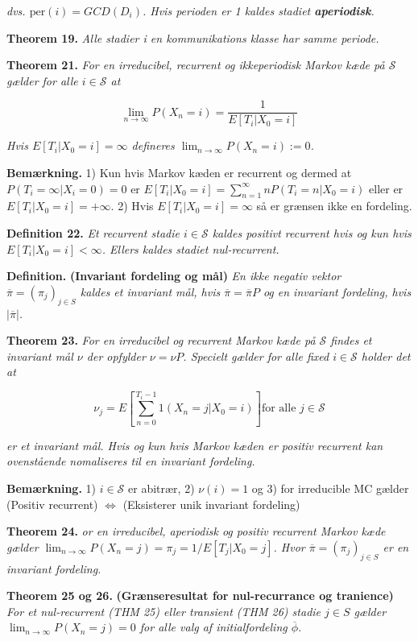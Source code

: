 \documentclass[
]{book}
\begin{document}
\emph{dvs. \(\text{per}(i)=GCD(D_i)\). Hvis perioden er 1 kaldes stadiet \textbf{aperiodisk}.}

\textbf{Theorem 19.} \emph{Alle stadier i en kommunikations klasse har samme periode.}

\textbf{Theorem 21.} \emph{For en irreducibel, recurrent og ikkeperiodisk Markov kæde på \(\mathcal{S}\) gælder for alle \(i\in\mathcal{S}\) at}

\[
\lim_{n\to\infty}P(X_n=i)=\frac{1}{E[T_i \vert X_0=i]}
\]

\emph{Hvis \(E[T_i \vert X_0=i]=\infty\) defineres \(\lim_{n\to\infty}P(X_n=i):=0\).}

\textbf{Bemærkning.} 1) Kun hvis Markov kæden er recurrent og dermed at \(P(T_i=\infty \vert X_i=0)=0\) er \(E[T_i \vert X_0=i]=\sum_{n=1}^\infty nP(T_i=n\vert X_0=i)\) eller er \(E[T_i \vert X_0=i]=+\infty\). 2) Hvis \(E[T_i \vert X_0=i]=\infty\) så er grænsen ikke en fordeling.

\textbf{Definition 22.} \emph{Et recurrent stadie \(i\in\mathcal{S}\) kaldes positivt recurrent hvis og kun hvis \(E[T_i \vert X_0=i]<\infty\). Ellers kaldes stadiet nul-recurrent.}

\textbf{Definition.} \textbf{(Invariant fordeling og mål)} \emph{En ikke negativ vektor \(\overline{\pi}=(\pi_j)_{j\in S}\) kaldes et invariant mål, hvis \(\overline{\pi}=\overline{\pi}P\) og en invariant fordeling, hvis \(\vert\overline{\pi}\vert\).}

\textbf{Theorem 23.} \emph{For en irreducibel og recurrent Markov kæde på \(\mathcal{S}\) findes et invariant mål \(\nu\) der opfylder \(\nu =\nu P\). Specielt gælder for alle fixed \(i\in\mathcal{S}\) holder det at}

\[
\nu_j=E\left[\sum_{n=0}^{T_i-1}1(X_n=j \vert X_0=i)\right] \text{for alle } j\in\mathcal{S}
\]

\emph{er et invariant mål. Hvis og kun hvis Markov kæden er positiv recurrent kan ovenstående nomaliseres til en invariant fordeling.}

\textbf{Bemærkning.} 1) \(i\in\mathcal{S}\) er abitrær, 2) \(\nu(i)=1\) og 3) for irreducible MC gælder (Positiv recurrent) \(\Leftrightarrow\) (Eksisterer unik invariant fordeling)

\textbf{Theorem 24.} \emph{or en irreducibel, aperiodisk og positiv recurrent Markov kæde gælder \(\lim_{n\to\infty}P(X_n=j)=\pi_j=1/E[T_j\vert X_0=j]\). Hvor \(\overline{\pi}=(\pi_j)_{j\in S}\) er en invariant fordeling.}

\textbf{Theorem 25 og 26.} \textbf{(Grænseresultat for nul-recurrance og tranience)} \emph{For et nul-recurrent (THM 25) eller transient (THM 26) stadie \(j\in S\) gælder \(\lim_{n\to\infty}P(X_n=j)=0\) for alle valg af initialfordeling \(\overline{\phi}\).}
\end{document}

